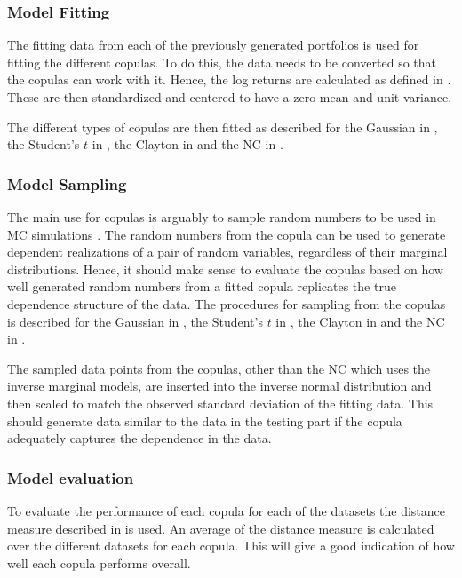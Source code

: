 












\subsubsection{Model Fitting}
The fitting data from each of the previously generated portfolios is used for fitting the different copulas. To do this, the data needs to be converted so that the copulas can work with it. Hence, the log returns are calculated as defined in . These are then standardized and centered to have a zero mean and unit variance. 

The different types of copulas are then fitted as described for the Gaussian in , the Student's $t$ in , the Clayton in  and the \gls{NC} in . 


\subsubsection{Model Sampling}
The main use for copulas is arguably to sample random numbers to be used in \gls{MC} simulations . The random numbers from the copula can be used to generate dependent realizations of a pair of random variables, regardless of their marginal distributions. Hence, it should make sense to evaluate the copulas based on how well generated random numbers from a fitted copula replicates the true dependence structure of the data. The procedures for sampling from the copulas is described for the Gaussian in , the Student's $t$ in , the Clayton in  and the \gls{NC} in . 

The sampled data points from the copulas, other than the \gls{NC} which uses the inverse marginal models, are inserted into the inverse normal distribution and then scaled to match the observed standard deviation of the fitting data. This should generate data similar to the data in the testing part if the copula adequately captures the dependence in the data.

\subsubsection{Model evaluation}
To evaluate the performance of each copula for each of the datasets the distance measure described in  is used. An average of the distance measure is calculated over the different datasets for each copula. This will give a good indication of how well each copula performs overall. 














